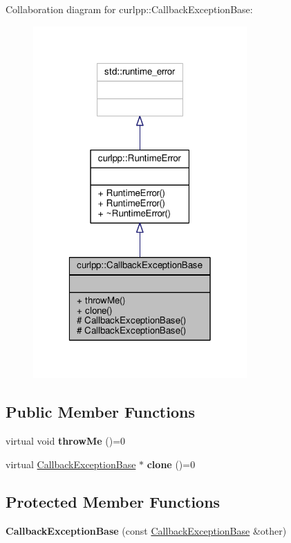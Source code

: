 Collaboration diagram for curlpp\-:\-:Callback\-Exception\-Base\-:\nopagebreak
\begin{figure}[H]
\begin{center}
\leavevmode
\includegraphics[width=232pt]{classcurlpp_1_1CallbackExceptionBase__coll__graph}
\end{center}
\end{figure}
\subsection*{Public Member Functions}
\begin{DoxyCompactItemize}
\item 
\hypertarget{classcurlpp_1_1CallbackExceptionBase_a4fd828e9866ed8bc914051738c530d8f}{virtual void {\bfseries throw\-Me} ()=0}\label{classcurlpp_1_1CallbackExceptionBase_a4fd828e9866ed8bc914051738c530d8f}

\item 
\hypertarget{classcurlpp_1_1CallbackExceptionBase_a9bdb8d529c717cdb1055ab65b38a4912}{virtual \hyperlink{classcurlpp_1_1CallbackExceptionBase}{Callback\-Exception\-Base} $\ast$ {\bfseries clone} ()=0}\label{classcurlpp_1_1CallbackExceptionBase_a9bdb8d529c717cdb1055ab65b38a4912}

\end{DoxyCompactItemize}
\subsection*{Protected Member Functions}
\begin{DoxyCompactItemize}
\item 
\hypertarget{classcurlpp_1_1CallbackExceptionBase_a31a83304a2506ac7b6723d85a4744047}{{\bfseries Callback\-Exception\-Base} (const \hyperlink{classcurlpp_1_1CallbackExceptionBase}{Callback\-Exception\-Base} \&other)}\label{classcurlpp_1_1CallbackExceptionBase_a31a83304a2506ac7b6723d85a4744047}

\end{DoxyCompactItemize}


